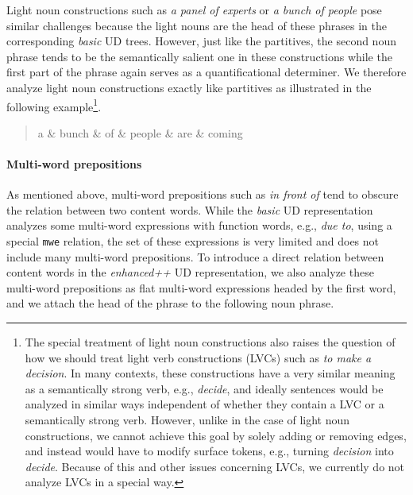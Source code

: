 \documentclass[10pt, a4paper]{article}
\begin{document}
Light noun constructions \cite{simone2014light} such as \textit{a panel of experts} or
\textit{a bunch of people} pose similar challenges because the light nouns are the head of
these phrases in the corresponding \textit{basic} UD trees. However, just like the partitives,
the second noun phrase tends to be the semantically salient one in these constructions
while the first part of the phrase again serves as a quantificational determiner. We therefore analyze
light noun constructions exactly like partitives as illustrated in the following example\footnote{The special treatment 
of light noun constructions also raises the question 
of how we should treat light verb constructions (LVCs) 
\cite{jespersen1954modern} such as \textit{to make a decision}. 
In many contexts, these constructions have a very similar meaning 
as a semantically strong verb, e.g., \textit{decide}, and ideally 
sentences would be analyzed in similar ways independent of 
whether they contain a LVC or a semantically strong verb. 
However, unlike in the case of light noun constructions, we 
cannot achieve this goal by solely adding or removing edges, 
and instead would have to modify surface tokens, e.g., turning 
\textit{decision} into \textit{decide}. Because of this and other 
issues concerning LVCs, we currently do not analyze LVCs in 
a special way.}.

 \begin{quote}
\begin{center}
\begin{dependency}[column sep=0.2em, edge unit distance=2.25ex]
  \begin{deptext}
    a \& bunch \& of \& people \& are \& coming \\
  \end{deptext}
\end{dependency}
\end{center}
\end{quote}


\paragraph{Multi-word prepositions} As mentioned above, multi-word prepositions such as \textit{in front of} tend to obscure the relation between two content words. While the \textit{basic} UD representation analyzes some multi-word expressions with function words, e.g., \textit{due to}, using a special \texttt{mwe} relation, the set of these expressions is very limited and does not include many multi-word prepositions. To introduce a direct relation between content words in the \textit{enhanced++} UD representation, we also analyze these multi-word prepositions as flat multi-word expressions headed by the first word, and we attach the head of the phrase to the following noun phrase.
\end{document}

